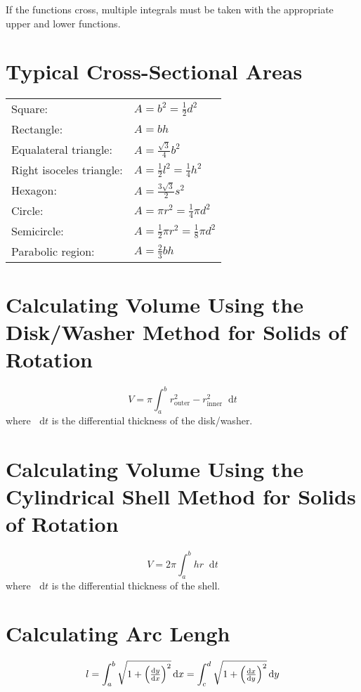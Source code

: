 \documentclass[12pt]{article}
\DeclarePairedDelimiter\paren{(}{)}
\newcommand*{\D}[1]{\mathop{}\!\mathrm{d}#1}
\newcommand*{\fixmath}{%
  \makebox{}\vspace{\glueexpr-\baselineskip-\abovedisplayskip}}
\newenvironment{fixaskip}{\setlength{\abovedisplayskip}{0pt}\fixmath%
  \ignorespaces}{\ignorespacesafterend}
\newenvironment{fixbskip}{\setlength{\belowdisplayskip}{0pt}\ignorespaces}%
  {\ignorespacesafterend}
\begin{document}
If the functions cross, multiple integrals must be taken with the appropriate
upper and lower functions.
\section*{Typical Cross-Sectional Areas}
{\renewcommand{\arraystretch}{1.5}\begin{tabular}{l@{ }l}
  Square: & \(A = b^2 = \frac{1}{2}d^2\)\\
  Rectangle: & \(A = bh\)\\
  Equalateral triangle: & \(A = \frac{\sqrt{3}}{4}b^2\)\\
  Right isoceles triangle: & \(A = \frac{1}{2}l^2 = \frac{1}{4}h^2\)\\
  Hexagon: & \(A = \frac{3\sqrt{3}}{2} s^2\)\\
  Circle: & \(A = \pi r^2 = \frac{1}{4}\pi d^2\)\\
  Semicircle: & \(A = \frac{1}{2}\pi r^2 = \frac{1}{8}\pi d^2\)\\
  Parabolic region: & \(A = \frac{2}{3}bh\)
\end{tabular}}
\section*{Calculating Volume Using the Disk\slash Washer Method for Solids of
Rotation}
\begin{fixaskip}
  \[
    V = \pi\int_a^b r_{\text{outer}}^2 - r_{\text{inner}}^2 \D{t}
  \]
\end{fixaskip}
where \(\D{t}\) is the differential thickness of the disk\slash washer.
\section*{Calculating Volume Using the Cylindrical Shell Method for Solids of
Rotation}
\begin{fixaskip}
  \[
    V = 2\pi \int_a^b hr \D{t}
  \]
\end{fixaskip}
where \(\D{t}\) is the differential thickness of the shell.
\section*{Calculating Arc Lengh}
\begin{fixbskip}
  \[
    l = \int_a^b \sqrt{1+{\paren*{\dd[y]{x}}}^2} \D{x}
    = \int_c^d \sqrt{1+{\paren*{\dd[x]{y}}}^2} \D{y}
  \]
\end{fixbskip}
\end{document}
